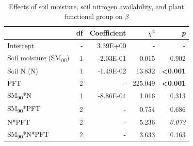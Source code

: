 \newpage
\begin{table}
    \centering
    \caption{Effects of soil moisture, soil nitrogen availability, and plant functional group on $\beta$}
        \begin{tabular}{p{3.75cm}p{0.5cm}p{2cm}p{1.5cm}p{1.5cm}}
            \hline 
            & \multicolumn{1}{r}{df} 
            & \multicolumn{1}{r}{Coefficient} 
            & \multicolumn{1}{r}{$\chi^{2}$} 
            & \multicolumn{1}{r}{\textit{p}} 
            \\ 
            \hline
            
            Intercept
            & \multicolumn{1}{r}{-}
            & \multicolumn{1}{r}{3.39E+00}
            & \multicolumn{1}{r}{-}
            & \multicolumn{1}{r}{-}
            \\

            Soil moisture (SM\textsubscript{90})
            & \multicolumn{1}{r}{1}
            & \multicolumn{1}{r}{-2.03E-01}
            & \multicolumn{1}{r}{0.015}
            & \multicolumn{1}{r}{0.902}
            \\

            Soil N (N)
            & \multicolumn{1}{r}{1}
            & \multicolumn{1}{r}{-1.49E-02}
            & \multicolumn{1}{r}{13.832}
            & \multicolumn{1}{r}{\textbf{<0.001}}
            \\

            PFT
            & \multicolumn{1}{r}{2}
            & \multicolumn{1}{r}{-}
            & \multicolumn{1}{r}{225.049}
            & \multicolumn{1}{r}{\textbf{<0.001}}
            \\

            SM\textsubscript{90}*N
            & \multicolumn{1}{r}{1}
            & \multicolumn{1}{r}{-8.86E-04}
            & \multicolumn{1}{r}{1.016}
            & \multicolumn{1}{r}{0.313}
            \\

            SM\textsubscript{90}*PFT
            & \multicolumn{1}{r}{2}
            & \multicolumn{1}{r}{-}
            & \multicolumn{1}{r}{0.754}
            & \multicolumn{1}{r}{0.686}
            \\

            N*PFT
            & \multicolumn{1}{r}{2}
            & \multicolumn{1}{r}{-}
            & \multicolumn{1}{r}{5.236}
            & \multicolumn{1}{r}{\textit{0.073}}
            \\

            SM\textsubscript{90}*N*PFT
            & \multicolumn{1}{r}{2}
            & \multicolumn{1}{r}{-}
            & \multicolumn{1}{r}{3.633}
            & \multicolumn{1}{r}{0.163}
            \\
            \hline
        \end{tabular}%
    \label{tab:table4.2}
\end{table}

